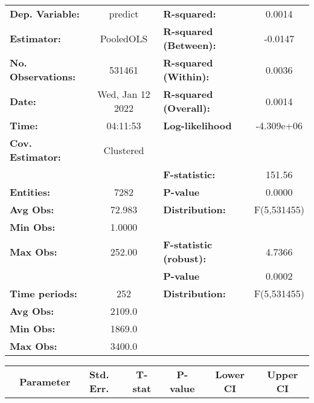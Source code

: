 \begin{center}
\begin{tabular}{lclc}
\toprule
\textbf{Dep. Variable:}    &      predict       & \textbf{  R-squared:         }   &      0.0014      \\
\textbf{Estimator:}        &     PooledOLS      & \textbf{  R-squared (Between):}  &     -0.0147      \\
\textbf{No. Observations:} &       531461       & \textbf{  R-squared (Within):}   &      0.0036      \\
\textbf{Date:}             &  Wed, Jan 12 2022  & \textbf{  R-squared (Overall):}  &      0.0014      \\
\textbf{Time:}             &      04:11:53      & \textbf{  Log-likelihood     }   &    -4.309e+06    \\
\textbf{Cov. Estimator:}   &     Clustered      & \textbf{                     }   &                  \\
\textbf{}                  &                    & \textbf{  F-statistic:       }   &      151.56      \\
\textbf{Entities:}         &        7282        & \textbf{  P-value            }   &      0.0000      \\
\textbf{Avg Obs:}          &       72.983       & \textbf{  Distribution:      }   &   F(5,531455)    \\
\textbf{Min Obs:}          &       1.0000       & \textbf{                     }   &                  \\
\textbf{Max Obs:}          &       252.00       & \textbf{  F-statistic (robust):} &      4.7366      \\
\textbf{}                  &                    & \textbf{  P-value            }   &      0.0002      \\
\textbf{Time periods:}     &        252         & \textbf{  Distribution:      }   &   F(5,531455)    \\
\textbf{Avg Obs:}          &       2109.0       & \textbf{                     }   &                  \\
\textbf{Min Obs:}          &       1869.0       & \textbf{                     }   &                  \\
\textbf{Max Obs:}          &       3400.0       & \textbf{                     }   &                  \\
\bottomrule
\end{tabular}
\begin{tabular}{lcccccc}
                & \textbf{Parameter} & \textbf{Std. Err.} & \textbf{T-stat} & \textbf{P-value} & \textbf{Lower CI} & \textbf{Upper CI}  \\

\end{tabular}
\end{center}
